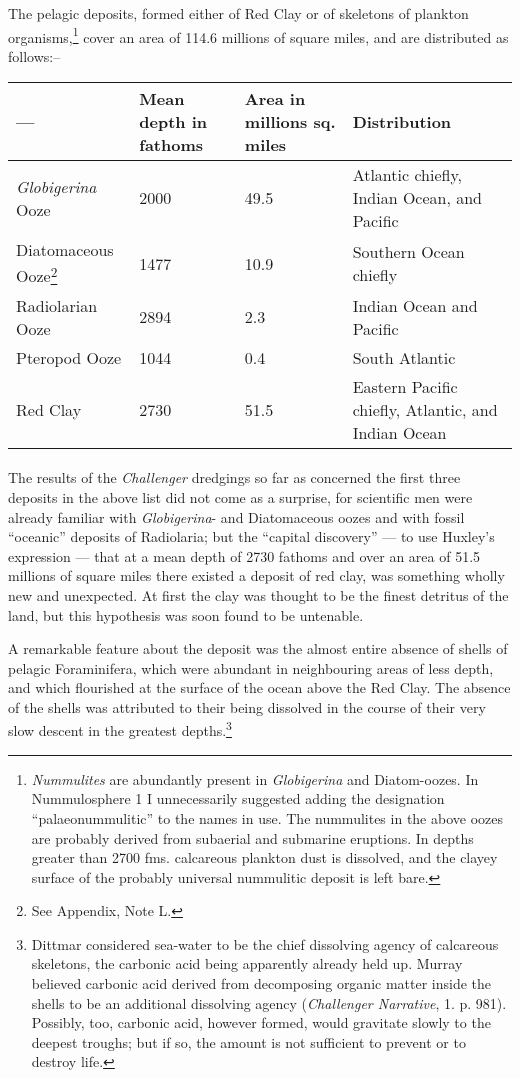 \documentclass[a4paper, 12pt, oneside]{article}
\begin{document}
The pelagic deposits, formed either of Red Clay or of skeletons of plankton organisms,\footnote{\emph{Nummulites} are abundantly present in \emph{Globigerina} and Diatom-oozes. In Nummulosphere 1 I unnecessarily suggested adding the designation ``palaeonummulitic'' to the names in use. The nummulites in the above oozes are probably derived from subaerial and submarine eruptions. In depths greater than 2700 fms. calcareous plankton dust is dissolved, and the clayey surface of the probably universal nummulitic deposit is left bare.} cover an area of 114.6 millions of square miles, and are distributed as follows:--
\begin{center}
\begin{tabular}{ |m{9em}|m{4em}|m{4em}|m{12em}| }
 \hline
 --- & Mean depth in fathoms & Area in millions sq. miles & Distribution \\
 \hline
 \emph{Globigerina} Ooze & 2000 & 49.5 & Atlantic chiefly, Indian Ocean, and Pacific \\
 \hline
 Diatomaceous Ooze\footnote{See Appendix, Note L.} & 1477 & 10.9 & Southern Ocean chiefly \\
 \hline
 Radiolarian Ooze & 2894 & 2.3 & Indian Ocean and Pacific \\
 \hline
 Pteropod Ooze & 1044 & 0.4 & South Atlantic \\
 \hline
 Red Clay & 2730 & 51.5 & Eastern Pacific chiefly, Atlantic, and Indian Ocean \\
 \hline
\end{tabular}
\end{center}
\paragraph{}
The results of the \emph{Challenger} dredgings so far as concerned the first three deposits in the above list did not come as a surprise, for scientific men were already familiar with \emph{Globigerina}- and Diatomaceous oozes and with fossil ``oceanic'' deposits of Radiolaria; but the ``capital discovery'' --- to use Huxley's expression --- that at a mean depth of 2730 fathoms and over an area of 51.5 millions of square miles there existed a deposit of red clay, was something wholly new and unexpected. At first the clay was thought to be the finest detritus of the land, but this hypothesis was soon found to be untenable.

A remarkable feature about the deposit was the almost entire absence of shells of pelagic Foraminifera, which were abundant in neighbouring areas of less depth, and which flourished at the surface of the ocean above the Red Clay. The absence of the shells was attributed to their being dissolved in the course of their very slow descent in the greatest depths.\footnote{Dittmar considered sea-water to be the chief dissolving agency of calcareous skeletons, the carbonic acid being apparently already held up. Murray believed carbonic acid derived from decomposing organic matter inside the shells to be an additional dissolving agency (\emph{Challenger Narrative}, 1. p. 981). Possibly, too, carbonic acid, however formed, would gravitate slowly to the deepest troughs; but if so, the amount is not sufficient to prevent or to destroy life.}
\end{document}
